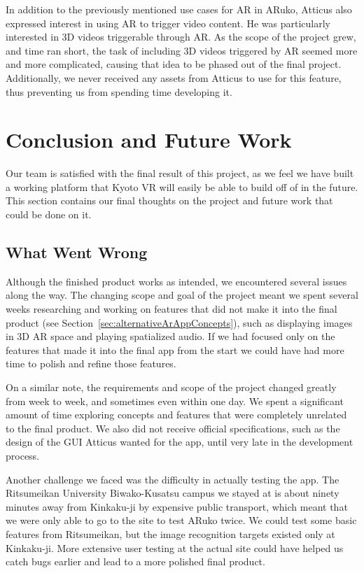 \documentclass[a4paper, 10pt, american, titlepage]{article}
\begin{document}
In addition to the previously mentioned use cases for AR in ARuko, Atticus also
expressed interest in using AR to trigger video content. He was particularly
interested in 3D videos triggerable through AR. As the scope of the project 
grew, and time ran short, the task of including 3D videos triggered by AR 
seemed more and more complicated, causing that idea to be phased out of the
final project. Additionally, we never received any assets from Atticus to use
for this feature, thus preventing us from spending time developing it. 

\clearpage

\section{Conclusion and Future Work}
\label{sec:conclusionAndFutureWork}

Our team is satisfied with the final result of this project, as we feel we have
built a working platform that Kyoto VR will easily be able to build off of in
the future. This section contains our final thoughts on the project and future
work that could be done on it.

\subsection{What Went Wrong}
\label{sec:whatWentWrong}

Although the finished product works as intended, we encountered several issues
along the way. The changing scope and goal of the project meant we spent
several weeks researching and working on features that did not make it into the
final product (see Section~\ref{sec:alternativeArAppConcepts}), such as
displaying images in 3D AR space and playing spatialized audio. If we had
focused only on the features that made it into the final app from the start we
could have had more time to polish and refine those features.

On a similar note, the requirements and scope of the project changed greatly
from week to week, and sometimes even within one day. We spent a significant
amount of time exploring concepts and features that were completely unrelated to
the final product. We also did not receive official specifications, such as the
design of the GUI Atticus wanted for the app, until very late in the development
process.

Another challenge we faced was the difficulty in actually testing the app. The
Ritsumeikan University Biwako-Kusatsu campus we stayed at is about ninety
minutes away from Kinkaku-ji by expensive public transport, which meant that we
were only able to go to the site to test ARuko twice. We could test some basic
features from Ritsumeikan, but the image recognition targets existed only at
Kinkaku-ji. More extensive user testing at the actual site could have helped us
catch bugs earlier and lead to a more polished final product.
\end{document}
